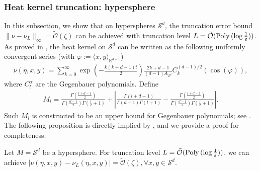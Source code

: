 

\subsubsection{Heat kernel truncation: hypersphere}\label{Subsection_Sphere_L_infty}

In this subsection, we show that on hyperspheres $\mathcal{S}^{d}$, 
the truncation error bound $\|\nu - \nu_{L}\|_{\infty} = \tilde{\mathcal{O}}(\zeta)$ 
can be achieved with truncation level $L = \tilde{\mathcal{O}}(\operatorname{Poly\,} (\log \frac{1}{\varepsilon}))$. As proved in \cite{zhao2018exact}, the heat kernel on $\mathcal{S}^{d}$ 
can be written as the following uniformly convergent series 
(with $\varphi := \langle x, y \rangle_{\mathbb{R}^{d+1}}$)
\begin{align*}
    \nu(\eta, x, y) = \sum_{k = 0}^{\infty} \exp(-\frac{k(k+d-1)t}{2})\frac{2k+d - 1}{(d-1) A_{\mathcal{S}^{d}}} C_{k}^{(d-1)/2}(\cos (\varphi)),
\end{align*}
where $C_{l}^{\alpha}$ are the Gegenbauer polynomials. 
Define \begin{align*}
    M_{l} = \frac{\Gamma(\frac{l+d-1}{2})}{\Gamma(\frac{d-1}{2})\Gamma(\frac{l}{2}+1)}
    + \left|\frac{\Gamma(l+d-1)}{\Gamma(d-1)\Gamma(l+1)} - \frac{\Gamma(\frac{l+d-1}{2})}{\Gamma(\frac{d-1}{2})\Gamma(\frac{l}{2}+1)}\right|.
\end{align*}
Such $M_{l}$ is constructed to be an upper bound for Gegenbauer polynomials; see \citet[Proof of Theorem 1]{zhao2018exact}.  The following proposition is directly implied by \citet[Theorem 1]{zhao2018exact}, 
and we provide a proof for completeness. 

\begin{proposition}\label{Zeta_dependency_hypersphere_truncation}
    Let $M = \mathcal{S}^{d}$ be a hypersphere. 
    For truncation level $L = \tilde{\mathcal{O}}(\operatorname{Poly\,} (\log \frac{1}{\varepsilon}))$, 
    we can achieve $|\nu(\eta, x, y) - \nu_{L}(\eta, x, y)| = \tilde{\mathcal{O}}(\zeta), \forall x, y \in \mathcal{S}^{d}$.
\end{proposition}

